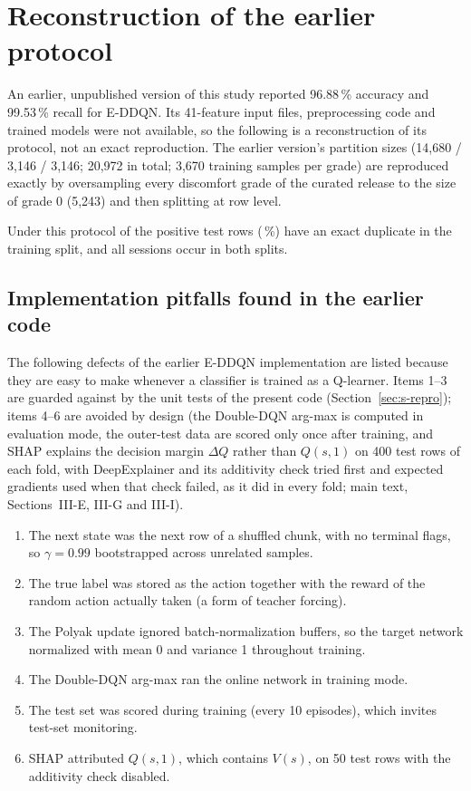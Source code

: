 \section{Reconstruction of the earlier protocol}
\label{sec:s-earlier}
An earlier, unpublished version of this study reported 96.88\,\% accuracy and 99.53\,\% recall for E-DDQN. Its 41-feature input files, preprocessing code and trained models were not available, so the following is a reconstruction of its protocol, not an exact reproduction. The earlier version's partition sizes (14,680 / 3,146 / 3,146; 20,972 in total; 3,670 training samples per grade) are reproduced exactly by oversampling every discomfort grade of the curated release to the size of grade 0 (5,243) and then splitting at row level.

\noindent\resizebox{\textwidth}{!}{}

\medskip
Under this protocol \LeakDupPos{} of the \LeakTestPos{} positive test rows (\LeakDupPct\,\%) have an exact duplicate in the training split, and all sessions occur in both splits.

\subsection*{Implementation pitfalls found in the earlier code}
The following defects of the earlier E-DDQN implementation are listed because they are easy to make whenever a classifier is trained as a Q-learner. Items 1--3 are guarded against by the unit tests of the present code (Section~\ref{sec:s-repro}); items 4--6 are avoided by design (the Double-DQN arg-max is computed in evaluation mode, the outer-test data are scored only once after training, and SHAP explains the decision margin $\Delta Q$ rather than $Q(s,1)$ on 400 test rows of each fold, with DeepExplainer and its additivity check tried first and expected gradients used when that check failed, as it did in every fold; main text, Sections~III-E, III-G and III-I).
\begin{enumerate}
\item The next state was the next row of a shuffled chunk, with no terminal flags, so $\gamma=0.99$ bootstrapped across unrelated samples.
\item The true label was stored as the action together with the reward of the random action actually taken (a form of teacher forcing).
\item The Polyak update ignored batch-normalization buffers, so the target network normalized with mean 0 and variance 1 throughout training.
\item The Double-DQN arg-max ran the online network in training mode.
\item The test set was scored during training (every 10 episodes), which invites test-set monitoring.
\item SHAP attributed $Q(s,1)$, which contains $V(s)$, on 50 test rows with the additivity check disabled.
\end{enumerate}
